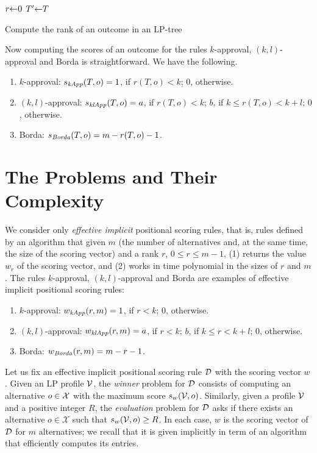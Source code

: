 \begin{algorithm}
	$r \mathit{\leftarrow} 0$\;
	$T' \mathit{\leftarrow} T$\;
\caption{Compute the rank of an outcome in an LP-tree\label{alg:rank}}
\end{algorithm}

Now computing the scores of an outcome for the rules
$k$-approval, $(k,l)$-approval and Borda is straightforward.
We have the following.
\begin{enumerate}
	\item $k$-approval: $s_{\mathit{kApp}}(T,o)=1$, if $r(T,o)<k$; $0$, otherwise.
	\item $(k,l)$-approval: $s_{\mathit{klApp}}(T,o)=a$, if $r(T,o)<k$; $b$, if $k\leq r(T,o)<k+l$;
				$0$, otherwise.
	\item Borda: $s_{\mathit{Borda}}(T,o)=m-r(T,o)-1$.
\end{enumerate}


\section{The Problems and Their Complexity}

We consider only \emph{effective implicit} positional scoring rules, 
that is, rules defined by an algorithm that given $m$ (the number of 
alternatives and, at the same time, the size of the scoring vector) 
and a rank $r$, $0\leq r\leq m-1$, (1) returns the value $w_r$ of 
the scoring vector, and (2) works in time polynomial in the sizes of 
$r$ and $m$. The rules $k$-approval, $(k,l)$-approval and Borda are examples 
of effective implicit positional scoring rules:

\begin{enumerate}
	\item $k$-approval: $w_{\mathit{kApp}}(r,m)=1$, if $r<k$; $0$, otherwise.
	\item $(k,l)$-approval: $w_{\mathit{klApp}}(r,m)=a$, if $r<k$; $b$, if $k\leq r<k+l$;
				$0$, otherwise.
	\item Borda: $w_{\mathit{Borda}}(r,m)=m-r-1$.
\end{enumerate}

Let us fix an effective implicit positional scoring rule $\mathcal{D}$ with the
scoring vector $w$. Given an LP profile $\mathcal{V}$, the \emph{winner} problem for
$\mathcal{D}$ consists of computing an alternative $o \in \mathcal{X}$ with the maximum 
score $s_w(\mathcal{V},o)$. Similarly, given a profile $\mathcal{V}$ and a positive integer 
$R$, the \emph{evaluation} problem for $\mathcal{D}$ asks if there exists an 
alternative $o \in \mathcal{X}$ such that $s_{{w}}(\mathcal{V}, o)\geq R$. In 
each case, $w$ is the scoring vector of $\mathcal{D}$ for $m$ alternatives; we recall
that it is given implicitly in term of an algorithm that efficiently 
computes its entries.
     
